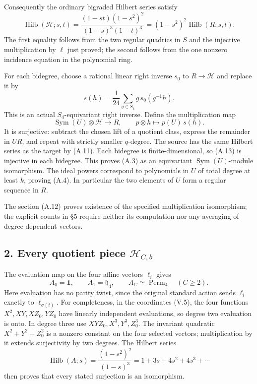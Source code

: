 \documentclass[
  10pt,
]{article}
\begin{document}
Consequently the ordinary bigraded Hilbert series satisfy \[
\operatorname{Hilb}(\mathcal H;s,t)
=\frac{(1-st)(1-s^2)^2}{(1-s)^3(1-t)^3}
=(1-s^2)^2\operatorname{Hilb}(R;s,t).
\tag{A.11}
\] The first equality follows from the two regular quadrics in \(S\) and
the injective multiplication by \(\ell\) just proved; the second follows
from the one nonzero incidence equation in the polynomial ring.

For each bidegree, choose a rational linear right inverse \(s_0\) to
\(R\to\mathcal H\) and replace it by \[
s(h)=\frac1{24}\sum_{g\in S_4}g\,s_0(g^{-1}h).
\tag{A.12}
\] This is an actual \(S_4\)-equivariant right inverse. Define the
multiplication map \[
\operatorname{Sym}(U)\otimes\mathcal H\to R,\qquad
p\otimes h\longmapsto p(U)\,s(h).
\tag{A.13}
\] It is surjective: subtract the chosen lift of a quotient class,
express the remainder in \(UR\), and repeat with strictly smaller
\(q\)-degree. The source has the same Hilbert series as the target by
(A.11). Each bidegree is finite-dimensional, so (A.13) is injective in
each bidegree. This proves (A.3) as an equivariant
\(\operatorname{Sym}(U)\)-module isomorphism. The ideal powers
correspond to polynomials in \(U\) of total degree at least \(k\),
proving (A.4). In particular the two elements of \(U\) form a regular
sequence in \(R\).

The section (A.12) proves existence of the specified multiplication
isomorphism; the explicit counts in §5 require neither its computation
nor any averaging of degree-dependent vectors.

\subsection{\texorpdfstring{2. Every quotient piece
\(\mathcal H_{C,b}\)}{2. Every quotient piece \textbackslash mathcal H\_\{C,b\}}}\label{every-quotient-piece-mathcal-h_cb}

The evaluation map on the four affine vectors \(\ell_i\) gives \[
A_0=\mathbf1,\qquad A_1=\mathfrak h_4,\qquad
A_C\simeq\operatorname{Perm}_4\quad(C\ge2).
\tag{A.14}
\] Here evaluation has no parity twist, since the original standard
action sends \(\ell_i\) exactly to \(\ell_{\sigma(i)}\). For
completeness, in the coordinates (V.5), the four functions
\(X^2,XY,XZ_0,YZ_0\) have linearly independent evaluations, so degree
two evaluation is onto. In degree three use \(XYZ_0,X^3,Y^3,Z_0^3\). The
invariant quadratic \(X^2+Y^2+Z_0^2\) is a nonzero constant on the four
selected vectors; multiplication by it extends surjectivity by two
degrees. The Hilbert series \[
\operatorname{Hilb}(A;s)=\frac{(1-s^2)^2}{(1-s)^3}
=1+3s+4s^2+4s^3+\cdots
\] then proves that every stated surjection is an isomorphism.
\end{document}
